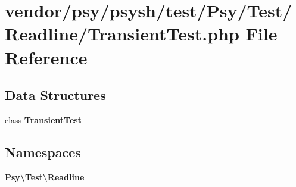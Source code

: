 \section{vendor/psy/psysh/test/\+Psy/\+Test/\+Readline/\+Transient\+Test.php File Reference}
\label{_transient_test_8php}
\subsection*{Data Structures}
\begin{DoxyCompactItemize}
\item 
class {\bf Transient\+Test}
\end{DoxyCompactItemize}
\subsection*{Namespaces}
\begin{DoxyCompactItemize}
\item 
 {\bf Psy\textbackslash{}\+Test\textbackslash{}\+Readline}
\end{DoxyCompactItemize}
